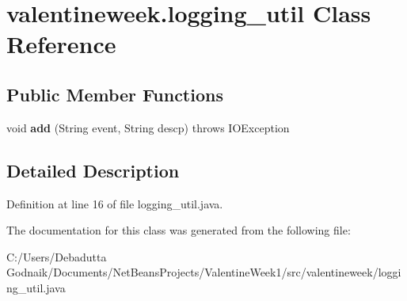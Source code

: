 \hypertarget{classvalentineweek_1_1logging__util}{}\section{valentineweek.\+logging\+\_\+util Class Reference}
\label{classvalentineweek_1_1logging__util}
\subsection*{Public Member Functions}
\begin{DoxyCompactItemize}
\item 
\mbox{\label{classvalentineweek_1_1logging__util_a42238f2a0b92a43fcc690c49e15ce064}} 
void {\bfseries add} (String event, String descp)  throws I\+O\+Exception      
\end{DoxyCompactItemize}


\subsection{Detailed Description}


Definition at line 16 of file logging\+\_\+util.\+java.



The documentation for this class was generated from the following file\+:\begin{DoxyCompactItemize}
\item 
C\+:/\+Users/\+Debadutta Godnaik/\+Documents/\+Net\+Beans\+Projects/\+Valentine\+Week1/src/valentineweek/logging\+\_\+util.\+java\end{DoxyCompactItemize}
